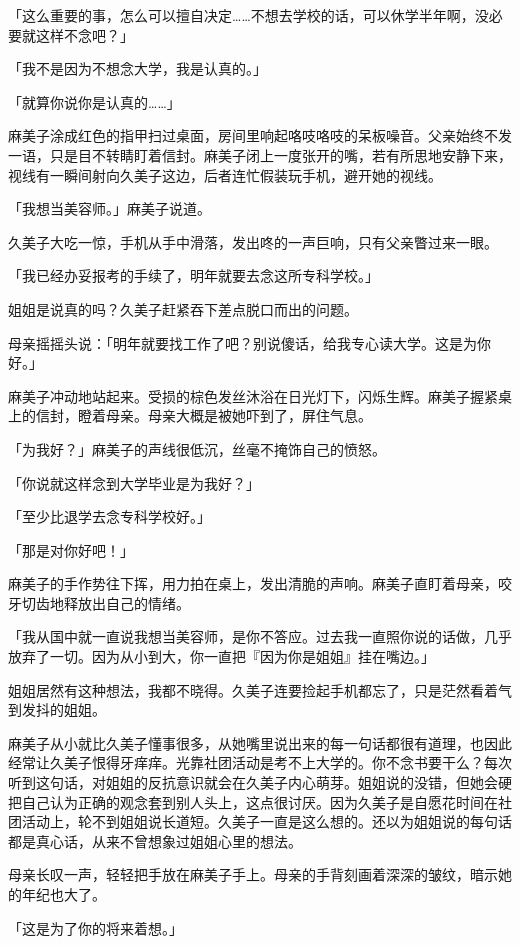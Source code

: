\documentclass[UTF8]{ctexart}
\begin{document}
    「这么重要的事，怎么可以擅自决定……不想去学校的话，可以休学半年啊，没必要就这样不念吧？」 

    「我不是因为不想念大学，我是认真的。」 

    「就算你说你是认真的……」 

    麻美子涂成红色的指甲扫过桌面，房间里响起咯吱咯吱的呆板噪音。父亲始终不发一语，只是目不转睛盯着信封。麻美子闭上一度张开的嘴，若有所思地安静下来，视线有一瞬间射向久美子这边，后者连忙假装玩手机，避开她的视线。 

    「我想当美容师。」麻美子说道。 

    久美子大吃一惊，手机从手中滑落，发出咚的一声巨响，只有父亲瞥过来一眼。 

    「我已经办妥报考的手续了，明年就要去念这所专科学校。」 

    姐姐是说真的吗？久美子赶紧吞下差点脱口而出的问题。 

    母亲摇摇头说：「明年就要找工作了吧？别说傻话，给我专心读大学。这是为你好。」 

    麻美子冲动地站起来。受损的棕色发丝沐浴在日光灯下，闪烁生辉。麻美子握紧桌上的信封，瞪着母亲。母亲大概是被她吓到了，屏住气息。 

    「为我好？」麻美子的声线很低沉，丝毫不掩饰自己的愤怒。 

    「你说就这样念到大学毕业是为我好？」 

    「至少比退学去念专科学校好。」 

    「那是对你好吧！」 

    麻美子的手作势往下挥，用力拍在桌上，发出清脆的声响。麻美子直盯着母亲，咬牙切齿地释放出自己的情绪。 

    「我从国中就一直说我想当美容师，是你不答应。过去我一直照你说的话做，几乎放弃了一切。因为从小到大，你一直把『因为你是姐姐』挂在嘴边。」 

    姐姐居然有这种想法，我都不晓得。久美子连要捡起手机都忘了，只是茫然看着气到发抖的姐姐。 

    麻美子从小就比久美子懂事很多，从她嘴里说出来的每一句话都很有道理，也因此经常让久美子恨得牙痒痒。光靠社团活动是考不上大学的。你不念书要干么？每次听到这句话，对姐姐的反抗意识就会在久美子内心萌芽。姐姐说的没错，但她会硬把自己认为正确的观念套到别人头上，这点很讨厌。因为久美子是自愿花时间在社团活动上，轮不到姐姐说长道短。久美子一直是这么想的。还以为姐姐说的每句话都是真心话，从来不曾想象过姐姐心里的想法。 

    母亲长叹一声，轻轻把手放在麻美子手上。母亲的手背刻画着深深的皱纹，暗示她的年纪也大了。 

    「这是为了你的将来着想。」 
\end{document}

